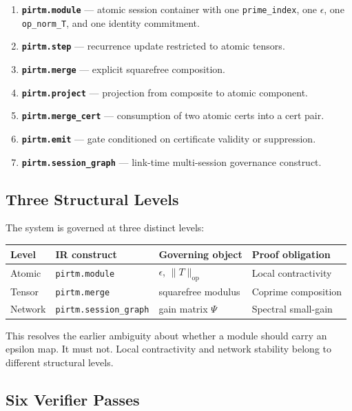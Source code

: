 \documentclass[11pt]{article}
\begin{document}
\begin{enumerate}[leftmargin=2em]
  \item \textbf{\texttt{pirtm.module}} --- atomic session container with one \texttt{prime\_index}, one \(\epsilon\), one \texttt{op\_norm\_T}, and one identity commitment.
  \item \textbf{\texttt{pirtm.step}} --- recurrence update restricted to atomic tensors.
  \item \textbf{\texttt{pirtm.merge}} --- explicit squarefree composition.
  \item \textbf{\texttt{pirtm.project}} --- projection from composite to atomic component.
  \item \textbf{\texttt{pirtm.merge\_cert}} --- consumption of two atomic certs into a cert pair.
  \item \textbf{\texttt{pirtm.emit}} --- gate conditioned on certificate validity or suppression.
  \item \textbf{\texttt{pirtm.session\_graph}} --- link-time multi-session governance construct.
\end{enumerate}

\subsection{Three Structural Levels}

The system is governed at three distinct levels:

\begin{center}
\begin{tabular}{llll}
\toprule
Level & IR construct & Governing object & Proof obligation \\
\midrule
Atomic & \texttt{pirtm.module} & \(\epsilon\), \(\|T\|_{\mathrm{op}}\) & Local contractivity \\
Tensor & \texttt{pirtm.merge} & squarefree modulus & Coprime composition \\
Network & \texttt{pirtm.session\_graph} & gain matrix \(\Psi\) & Spectral small-gain \\
\bottomrule
\end{tabular}
\end{center}

This resolves the earlier ambiguity about whether a module should carry an epsilon map. It must not. Local contractivity and network stability belong to different structural levels.

\subsection{Six Verifier Passes}
\end{document}
